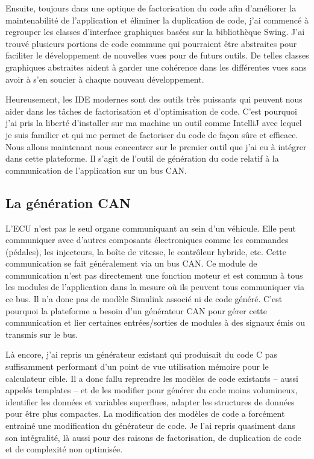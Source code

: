 Ensuite, toujours dans une optique de factorisation du code afin d'améliorer la
maintenabilité de l'application et éliminer la duplication de code, j'ai
commencé à regrouper les classes d'interface graphiques basées sur la
bibliothèque Swing. J'ai trouvé plusieurs portions de code commune qui
pourraient être abstraites pour faciliter le développement de nouvelles vues
pour de futurs outils. De telles classes graphiques abstraites aident à garder une
cohérence dans les différentes vues sans avoir à s'en soucier à chaque nouveau
développement.

Heureusement, les IDE modernes sont des outils très puissants qui peuvent nous
aider dans les tâches de factorisation et d'optimisation de code. C'est pourquoi
j'ai pris la liberté d'installer sur ma machine un outil comme IntelliJ avec
lequel je suis familier et qui me permet de factoriser du code de façon sûre et
efficace.\\

Nous allons maintenant nous concentrer sur le premier outil que j'ai eu à
intégrer dans cette plateforme. Il s'agit de l'outil de génération du code
relatif à la communication de l'application sur un bus CAN.

\subsection{La génération CAN}
L'ECU n'est pas le seul organe communiquant au sein d'un véhicule. Elle peut
communiquer avec d'autres composants électroniques comme les commandes
(pédales), les injecteurs, la boîte de vitesse, le contrôleur hybride, etc.
Cette communication se fait généralement via un bus CAN. Ce module de
communication n'est pas directement une fonction moteur et est commun à tous les
modules de l'application dans la mesure où ils peuvent tous communiquer via ce
bus. Il n'a donc pas de modèle Simulink\up{\circledR} associé ni de code généré.
C'est pourquoi la plateforme a besoin d'un générateur CAN pour gérer cette
communication et lier certaines entrées/sorties de modules à des signaux émis ou
transmis sur le bus.

Là encore, j'ai repris un générateur existant qui produisait du code C pas
suffisamment performant d'un point de vue utilisation mémoire pour le
calculateur cible. Il a donc fallu reprendre les modèles de code existants --
aussi appelés \og templates \fg{} -- et de les modifier pour générer du code
moins volumineux, identifier les données et variables superflues, adapter les
structures de données pour être plus compactes. La modification des modèles de
code a forcément entrainé une modification du générateur de code. Je l'ai repris
quasiment dans son intégralité, là aussi pour des raisons de factorisation, de
duplication de code et de complexité non optimisée.

